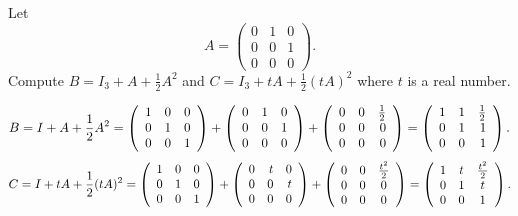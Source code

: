 \documentclass{ximera}
\begin{document}
\begin{exercise} \label{c4.7.4}
Let
\[
A = \left(\begin{array}{ccc} 0 & 1 & 0\\ 0 & 0 & 1 \\ 0 & 0 & 0 \end{array}
\right).
\]
Compute $B=I_3 + A + \frac{1}{2}A^2$ and $C=I_3 + tA + \frac{1}{2}(tA)^2$ where $t$ is a real number.

\begin{solution}
\soln
\[ 
B = I + A + \frac{1}{2}A^2 =
 \left(\begin{array}{rrr} 1 & 0 & 0 \\ 0 & 1 & 0 \\ 0 & 0 & 1\end{array}\right) +
\left(\begin{array}{rrr} 0 & 1 & 0 \\ 0 & 0 & 1 \\ 0 & 0 & 0\end{array}\right) +
\left(\begin{array}{rrr} 0 & 0 & \frac{1}{2} \\ 0 & 0 & 0 \\ 0 & 0 & 0\end{array}\right)
= \left(\begin{array}{rrr} 1 & 1 & \frac{1}{2} \\ 0 & 1 & 1 \\ 0 & 0 & 1\end{array}\right). 
\]
\[ 
C = I + tA + \frac{1}{2}(tA)^2 
= \left(\begin{array}{rrr} 1 & 0 & 0 \\ 0 & 1 & 0 \\ 0 & 0 & 1\end{array}\right) +
\left(\begin{array}{rrr} 0 & t & 0 \\ 0 & 0 & t \\ 0 & 0 & 0\end{array}\right) +
\left(\begin{array}{ccc} 0 & 0 & \frac{t^2}{2} \\ 0 & 0 & 0 \\ 0 & 0 & 0\end{array}\right)
= \left(\begin{array}{ccc} 1 & t & \frac{t^2}{2} \\ 0 & 1 & t \\ 0 & 0 & 1\end{array}\right). 
\]
\end{solution}
\end{exercise}
\end{document}
